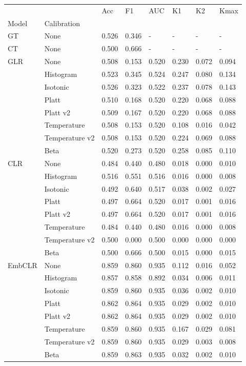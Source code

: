 \begin{tabular}{llllllll}
\toprule
 &  & Acc & F1 & AUC & K1 & K2 & Kmax \\
Model & Calibration &  &  &  &  &  &  \\
\midrule
GT & None & 0.526 & 0.346 & - & - & - & - \\
\cline{1-8}
CT & None & 0.500 & 0.666 & - & - & - & - \\
\cline{1-8}
\multirow[t]{8}{*}{GLR} & None & 0.508 & 0.153 & 0.520 & 0.230 & 0.072 & 0.094 \\
 & Histogram & 0.523 & 0.345 & 0.524 & 0.247 & 0.080 & 0.134 \\
 & Isotonic & 0.526 & 0.323 & 0.522 & 0.237 & 0.078 & 0.143 \\
 & Platt & 0.510 & 0.168 & 0.520 & 0.220 & 0.068 & 0.088 \\
 & Platt v2 & 0.509 & 0.167 & 0.520 & 0.220 & 0.068 & 0.088 \\
 & Temperature & 0.508 & 0.153 & 0.520 & 0.108 & 0.016 & 0.042 \\
 & Temperature v2 & 0.508 & 0.153 & 0.520 & 0.224 & 0.069 & 0.088 \\
 & Beta & 0.520 & 0.273 & 0.520 & 0.258 & 0.085 & 0.110 \\
\cline{1-8}
\multirow[t]{8}{*}{CLR} & None & 0.484 & 0.440 & 0.480 & 0.018 & 0.000 & 0.010 \\
 & Histogram & 0.516 & 0.551 & 0.516 & 0.016 & 0.000 & 0.008 \\
 & Isotonic & 0.492 & 0.640 & 0.517 & 0.038 & 0.002 & 0.027 \\
 & Platt & 0.497 & 0.664 & 0.520 & 0.017 & 0.001 & 0.016 \\
 & Platt v2 & 0.497 & 0.664 & 0.520 & 0.017 & 0.001 & 0.016 \\
 & Temperature & 0.484 & 0.440 & 0.480 & 0.016 & 0.000 & 0.008 \\
 & Temperature v2 & 0.500 & 0.000 & 0.500 & 0.000 & 0.000 & 0.000 \\
 & Beta & 0.500 & 0.666 & 0.500 & 0.015 & 0.000 & 0.015 \\
\cline{1-8}
\multirow[t]{8}{*}{EmbCLR} & None & 0.859 & 0.860 & 0.935 & 0.112 & 0.016 & 0.052 \\
 & Histogram & 0.857 & 0.858 & 0.892 & 0.034 & 0.006 & 0.011 \\
 & Isotonic & 0.859 & 0.860 & 0.935 & 0.036 & 0.002 & 0.010 \\
 & Platt & 0.862 & 0.864 & 0.935 & 0.029 & 0.002 & 0.010 \\
 & Platt v2 & 0.862 & 0.864 & 0.935 & 0.029 & 0.002 & 0.010 \\
 & Temperature & 0.859 & 0.860 & 0.935 & 0.167 & 0.029 & 0.081 \\
 & Temperature v2 & 0.859 & 0.860 & 0.935 & 0.029 & 0.003 & 0.008 \\
 & Beta & 0.859 & 0.863 & 0.935 & 0.032 & 0.002 & 0.010 \\
\cline{1-8}
\bottomrule
\end{tabular}
